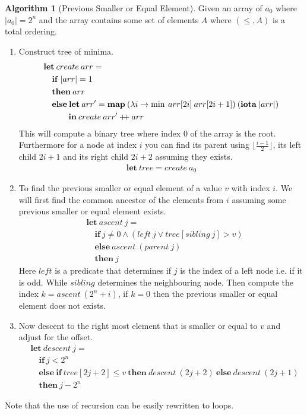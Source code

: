 \documentclass[a4paper,12pt]{article}
\newcommand\concat{\: \mathrlap{+} \: +}
\theoremstyle{definition}
\newtheorem{algorithm}{Algorithm}[section]
\begin{document}
\begin{algorithm}[Previous Smaller or Equal Element]\label{algo:psee}
  Given an array of $a_0$ where $|a_0| = 2^n$ and the array contains some set of elements $A$ where $(\leq, A)$ is a total ordering.
  \begin{enumerate}
    \item Construct tree of minima.
    \begin{align*}
      &\mathbf{let} \: create \: arr = \\
      &\quad \mathbf{if} \: |arr| = 1 \\
      &\quad \mathbf{then} \: arr \\
      &\quad \mathbf{else} \: \mathbf{let} \: arr' = \mathbf{map} \: (\lambda i \to \min \: arr[2i] \: arr[2i + 1] ) \: (\mathbf{iota} \: |arr|) \\
      &\quad \quad \quad \mathbf{in} \: create \: arr' \concat  arr
    \end{align*}
    This will compute a binary tree where index $0$ of the array is the root. Furthermore for a node at index $i$ you can find its parent using $\lfloor \frac{i - 1}{2} \rfloor$, its left child $2i + 1$ and its right child $2i + 2$ assuming they exists.
    \begin{align*}
      \mathbf{let} \: tree = create \: a_0
    \end{align*}
    \item To find the previous smaller or equal element of a value $v$ with index $i$. We will first find the common ancestor of the elements from $i$ assuming some previous smaller or equal element exists. 
    \begin{align*}
      &\mathbf{let} \: ascent \: j = \\
      &\quad \mathbf{if} \: j \neq 0 \land (left \: j \lor tree[sibling \: j] > v) \\
      &\quad \mathbf{else} \: ascent \: (parent \: j) \\
      &\quad \mathbf{then} \: j
    \end{align*}
    Here $left$ is a predicate that determines if $j$ is the index of a left node i.e. if it is odd. While $sibling$ determines the neighbouring node. Then compute the index $k = ascent \: (2^n + i)$, if $k = 0$ then the previous smaller or equal element does not exists.
    \item Now descent to the right most element that is smaller or equal to $v$ and adjust for the offset.
    \begin{align*}
      &\mathbf{let} \: descent \: j = \\
      &\quad \mathbf{if} \: j < 2^n \\
      &\quad \mathbf{else} \: \mathbf{if} \: tree[2j + 2] \leq v \: \mathbf{then} \: descent \: (2j + 2) \: \mathbf{else} \: descent \: (2j + 1)\\
      &\quad \mathbf{then} \: j - 2^n
    \end{align*}
  \end{enumerate}
\end{algorithm}
Note that the use of recursion can be easily rewritten to loops.
\end{document}
